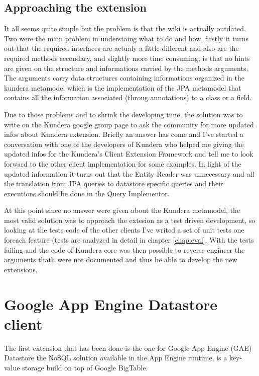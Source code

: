 \subsection{Approaching the extension}
It all seems quite simple but the problem is that the wiki is actually outdated. 
Two were the main problem in understaing what to do and how, firstly it turns out that the required interfaces are actualy a little different and also are the required methods
secondary, and slightly more time consuming, is that no hints are given on the structure and informations carried by the methods arguments.
The arguments carry data structures containing informations organized in the kundera metamodel which is the implementation of the JPA metamodel that contains all the information associated (throug annotations) to a class or a field.

Due to those problems and to shrink the developing time, the solution was to write on the Kundera google group page to ask the community for more updated infos about Kundera extension.
Briefly an answer has come and I've started a conversation with one of the developers of Kundera who helped me giving the updated infos for the Kundera's Client Extension Framework and tell me to look forward to the other client implementation for some examples. 
In light of the updated information it turns out that the Entity Reader was unnecessary and all the translation from JPA queries to datastore specific queries and their executions should be done in the Query Implementor.  

At this point since no answer were given about the Kundera metamodel, the most valid solution was to approach the extesion as a test driven development, so looking at the tests code of the other clients I've writed a set of unit tests one foreach feature (tests are analyzed in detail in chapter \ref{chap:eval}.
With the tests failing and the code of Kundera core was then possible to reverse engineer the arguments thath were not documented and thus be able to develop the new extensions.

\section{Google App Engine Datastore client}
\label{sec:kundera-datastore}
The first extension that has been done is the one for Google App Engine (GAE) Datastore the NoSQL solution available in the App Engine runtime, is a key-value storage build on top of Google BigTable.

